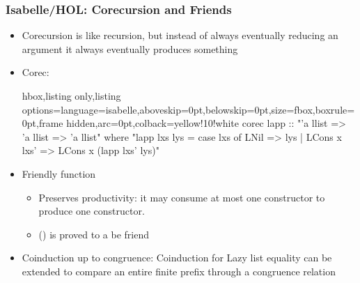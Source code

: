 \documentclass[aspectratio=169,10pt]{beamer}
\begin{document}
\begin{frame}[fragile]
  \frametitle{Isabelle/HOL: Corecursion and Friends}
  \begin{itemize}
          \item Corecursion is like recursion, but instead of always eventually reducing an argument it always eventually produces something
          \pause
    \item Corec:
\vspace*{-1ex}
\begin{tcblisting}{hbox,listing only,listing options={language=isabelle,aboveskip=0pt,belowskip=0pt},size=fbox,boxrule=0pt,frame hidden,arc=0pt,colback=yellow!10!white}
corec lapp :: "'a llist => 'a llist => 'a llist" where
  "lapp lxs lys = case lxs of LNil => lys | LCons x lxs' => LCons x (lapp lxs' lys)"
\end{tcblisting}
\vspace*{-1ex}
          \pause
    \item Friendly function
          \begin{itemize}
            \item Preserves productivity: it may consume at most one constructor to produce one constructor.
            \item {} () is proved to a be friend
          \end{itemize}
          \pause
          \item Coinduction up to congruence: Coinduction for Lazy list equality can be extended to compare an entire finite prefix through a congruence relation
  \end{itemize}
\end{frame}
\end{document}
